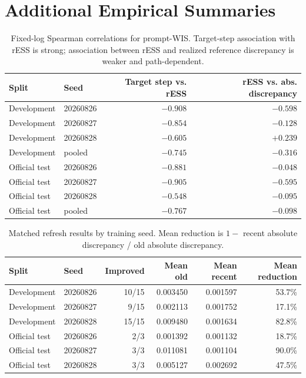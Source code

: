 \documentclass[10pt]{article}
\theoremstyle{remark}
\begin{document}
\section{Additional Empirical Summaries}
\label{app:empirical}
\begin{table}[H]
\centering
\caption{Fixed-log Spearman correlations for prompt-WIS. Target-step association with rESS is strong; association between rESS and realized reference discrepancy is weaker and path-dependent.}
\small
\begin{tabular}{@{}llrr@{}}
\toprule
Split & Seed & Target step vs. rESS & rESS vs. abs. discrepancy \\
\midrule
Development & 20260826 & $-0.908$ & $-0.598$ \\
Development & 20260827 & $-0.854$ & $-0.128$ \\
Development & 20260828 & $-0.605$ & $+0.239$ \\
Development & pooled & $-0.745$ & $-0.316$ \\
Official test & 20260826 & $-0.881$ & $-0.048$ \\
Official test & 20260827 & $-0.905$ & $-0.595$ \\
Official test & 20260828 & $-0.548$ & $-0.095$ \\
Official test & pooled & $-0.767$ & $-0.098$ \\
\bottomrule
\end{tabular}
\end{table}

\begin{table}[H]
\centering
\caption{Matched refresh results by training seed. Mean reduction is $1-$ recent absolute discrepancy / old absolute discrepancy.}
\small
\begin{tabular}{@{}llrrrr@{}}
\toprule
Split & Seed & Improved & Mean old & Mean recent & Mean reduction \\
\midrule
Development & 20260826 & 10/15 & 0.003450 & 0.001597 & 53.7\% \\
Development & 20260827 & 9/15 & 0.002113 & 0.001752 & 17.1\% \\
Development & 20260828 & 15/15 & 0.009480 & 0.001634 & 82.8\% \\
Official test & 20260826 & 2/3 & 0.001392 & 0.001132 & 18.7\% \\
Official test & 20260827 & 3/3 & 0.011081 & 0.001104 & 90.0\% \\
Official test & 20260828 & 3/3 & 0.005127 & 0.002692 & 47.5\% \\
\bottomrule
\end{tabular}
\end{table}
\end{document}
